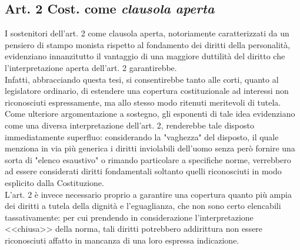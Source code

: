  
\subsection{Art. 2 Cost. come \textit{clausola aperta}}  

I sostenitori dell'art. 2 come clausola aperta, notoriamente caratterizzati da un pensiero di stampo monista rispetto al fondamento dei diritti della personalità, evidenziano innanzitutto il vantaggio di una maggiore duttilità del diritto che l'interpretazione aperta dell'art. 2 garantirebbe.
\\Infatti, abbracciando questa tesi, si consentirebbe tanto alle corti, quanto al legislatore ordinario, di estendere una copertura costituzionale ad interessi non riconosciuti espressamente, ma allo stesso modo ritenuti meritevoli di tutela. 
Come ulteriore argomentazione a sostegno, gli esponenti di tale idea evidenziano come una diversa interpretazione dell'art. 2, renderebbe tale disposto immediatamente superfluo: considerando la "vaghezza" del disposto, il quale menziona in via più generica i diritti inviolabili dell'uomo senza però fornire una sorta di "elenco esaustivo" o rimando particolare a specifiche norme, verrebbero ad essere considerati diritti fondamentali soltanto quelli riconosciuti in modo esplicito dalla Costituzione.
\\L'art. 2 è invece necessario proprio a garantire una copertura quanto più ampia dei diritti a tutela della dignità e l'eguaglianza, che non sono certo elencabili tassativamente: per cui prendendo in considerazione l'interpretazione <<chiusa>> della norma, tali diritti potrebbero addirittura non essere riconosciuti affatto in mancanza di una loro espressa indicazione.
 
